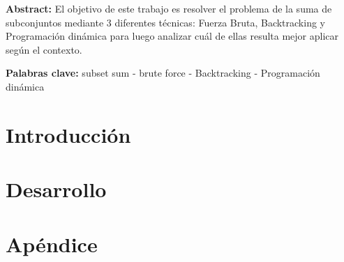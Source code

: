 \documentclass[10pt,a4paper]{article}
\begin{document}


\fecha{\today}



\maketitle
\par \textbf{Abstract:} El objetivo de este trabajo es resolver el problema de la suma de
subconjuntos mediante 3 diferentes t\'ecnicas: Fuerza Bruta, Backtracking y 
Programaci\'on din\'amica para luego analizar cu\'al de ellas resulta mejor aplicar seg\'un el contexto.

\par  \textbf{Palabras clave:} subset sum - brute force - Backtracking - Programaci\'on din\'amica
\tableofcontents



\section{Introducción}

\newpage

\section{Desarrollo}

\newpage

\section{Ap\'endice}

\newpage
\end{document}

